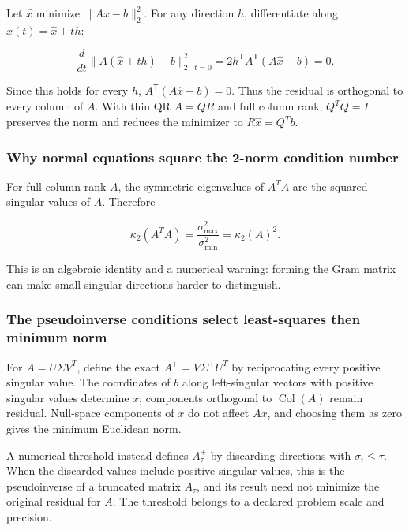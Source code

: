 Let \(\widehat x\) minimize \(\|Ax-b\|_2^2\). For any direction \(h\), differentiate along \(x(t)=\widehat x+th\):

\[
\frac{d}{dt}\|A(\widehat x+th)-b\|_2^2\bigg|_{t=0}
=2h^\mathsf T A^\mathsf T(A\widehat x-b)=0.
\]

Since this holds for every \(h\), \(A^\mathsf T(A\widehat x-b)=0\). Thus the residual is orthogonal to every column of \(A\). With thin QR \(A=QR\) and full column rank, \(Q^TQ=I\) preserves the norm and reduces the minimizer to \(R\widehat x=Q^Tb\).

\subsubsection{Why normal equations square the 2-norm condition number}\label{02-foundations-ii-ch039-why-normal-equations-square-the-2-norm-condition-number}

For full-column-rank \(A\), the symmetric eigenvalues of \(A^TA\) are the squared singular values of \(A\). Therefore

\[
\kappa_2(A^TA)=\frac{\sigma_{\max}^2}{\sigma_{\min}^2}=\kappa_2(A)^2.
\]

This is an algebraic identity and a numerical warning: forming the Gram matrix can make small singular directions harder to distinguish.

\subsubsection{The pseudoinverse conditions select least-squares then minimum norm}\label{02-foundations-ii-ch039-the-pseudoinverse-conditions-select-least-squares-then-minimum-norm}

For \(A=U\Sigma V^T\), define the exact \(A^+=V\Sigma^+U^T\) by reciprocating every positive singular value. The coordinates of \(b\) along left-singular vectors with positive singular values determine \(x\); components orthogonal to \(\operatorname{Col}(A)\) remain residual. Null-space components of \(x\) do not affect \(Ax\), and choosing them as zero gives the minimum Euclidean norm.

A numerical threshold instead defines \(A_\tau^+\) by discarding directions with \(\sigma_i\le\tau\). When the discarded values include positive singular values, this is the pseudoinverse of a truncated matrix \(A_\tau\), and its result need not minimize the original residual for \(A\). The threshold belongs to a declared problem scale and precision.

